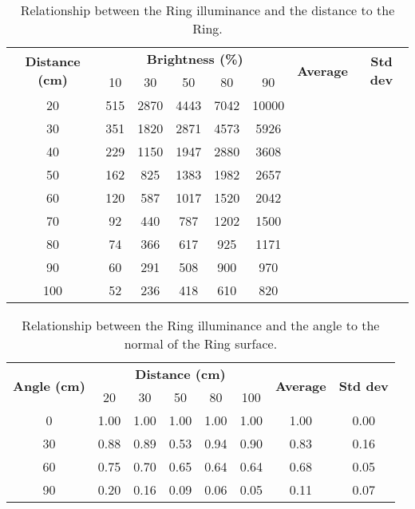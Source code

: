 \begin{table}[h!]
	\centering
	\caption{Relationship between the Ring illuminance and the distance to the Ring.}
	\label{table:illuminance_distance_value}
	\begin{tabular}{cccccccc}
		\hline
		\hline
		\toprule
		\multirow{2}{*}{\textbf{Distance (cm)}} & \multicolumn{5}{c}{\textbf{Brightness (\%)}} & \multirow{2}{*}{\textbf{Average}} & \multirow{2}{*}{\textbf{Std dev}}\\
		& 10 & 30 & 50 & 80 & 90 & 100 &\\
		\bottomrule
		\toprule
20	&	515	&	2870	&	4443	&	7042	&	10000	\\
30	&	351	&	1820	&	2871	&	4573	&	5926	\\
40	&	229	&	1150	&	1947	&	2880	&	3608	\\
50	&	162	&	825	&	1383	&	1982	&	2657	\\
60	&	120	&	587	&	1017	&	1520	&	2042	\\
70	&	92	&	440	&	787	&	1202	&	1500	\\
80	&	74	&	366	&	617	&	925	&	1171	\\
90	&	60	&	291	&	508	&	900	&	970	\\
100	&	52	&	236	&	418	&	610	&	820	\\
		\bottomrule
		\hline
		\hline
	\end{tabular}
\end{table}

\begin{table}[h!]
	\centering
	\caption{Relationship between the Ring illuminance and the angle to the normal of the Ring surface.}
	\label{table:illuminance_angle}
	\begin{tabular}{cccccccc}
		\hline
		\hline
		\toprule
		\multirow{2}{*}{\textbf{Angle (cm)}} & \multicolumn{5}{c}{\textbf{Distance (cm)}} & \multirow{2}{*}{\textbf{Average}} & \multirow{2}{*}{\textbf{Std dev}}\\
		& 20 & 30 & 50 & 80 & 100 &&\\
		\bottomrule
		\toprule
		0    &    1.00    &    1.00    &    1.00    &    1.00    &    1.00    &    1.00    &    0.00    \\
		30    &    0.88    &    0.89    &    0.53    &    0.94    &    0.90    &    0.83    &    0.16    \\
		60    &    0.75    &    0.70    &    0.65    &    0.64    &    0.64    &    0.68    &    0.05    \\
		90    &    0.20    &    0.16    &    0.09    &    0.06    &    0.05    &    0.11    &    0.07    \\
		\bottomrule
		\hline
		\hline
	\end{tabular}
\end{table}
